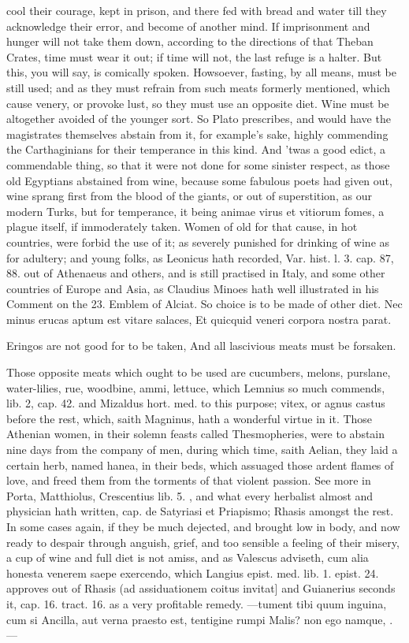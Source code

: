 cool their courage, kept in prison, and there fed with bread and water
till they acknowledge their error, and become of another mind. If
imprisonment and hunger will not take them down, according to the
directions of that  Theban Crates, time must wear it out; if time
will not, the last refuge is a halter. But this, you will say, is
comically spoken. Howsoever, fasting, by all means, must be still used;
and as they must refrain from such meats formerly mentioned, which
cause venery, or provoke lust, so they must use an opposite diet.
Wine must be altogether avoided of the younger sort. So
Plato prescribes, and would have the magistrates themselves
abstain from it, for example's sake, highly commending the
Carthaginians for their temperance in this kind. And 'twas a good
edict, a commendable thing, so that it were not done for some sinister
respect, as those old Egyptians abstained from wine, because some
fabulous poets had given out, wine sprang first from the blood of the
giants, or out of superstition, as our modern Turks, but for
temperance, it being animae virus et vitiorum fomes, a plague itself,
if immoderately taken. Women of old for that cause, in hot
countries, were forbid the use of it; as severely punished for drinking
of wine as for adultery; and young folks, as Leonicus hath recorded,
Var. hist. l. 3. cap. 87, 88. out of Athenaeus and others, and is still
practised in Italy, and some other countries of Europe and Asia, as
Claudius Minoes hath well illustrated in his Comment on the 23. Emblem
of Alciat. So choice is to be made of other diet.
Nec minus erucas aptum est vitare salaces,
Et quicquid veneri corpora nostra parat.

Eringos are not good for to be taken,
And all lascivious meats must be forsaken.

Those opposite meats which ought to be used are cucumbers, melons,
purslane, water-lilies, rue, woodbine, ammi, lettuce, which Lemnius so
much commends, lib. 2, cap. 42. and Mizaldus hort. med. to this
purpose; vitex, or agnus castus before the rest, which, saith
Magninus, hath a wonderful virtue in it. Those Athenian women, in
their solemn feasts called Thesmopheries, were to abstain nine days
from the company of men, during which time, saith Aelian, they laid a
certain herb, named hanea, in their beds, which assuaged those ardent
flames of love, and freed them from the torments of that violent
passion. See more in Porta, Matthiolus, Crescentius lib. 5. \etc{}, and
what every herbalist almost and physician hath written, cap. de
Satyriasi et Priapismo; Rhasis amongst the rest. In some cases again,
if they be much dejected, and brought low in body, and now ready to
despair through anguish, grief, and too sensible a feeling of their
misery, a cup of wine and full diet is not amiss, and as Valescus
adviseth, cum alia honesta venerem saepe exercendo, which Langius
epist. med. lib. 1. epist. 24. approves out of Rhasis (ad assiduationem
coitus invitat] and Guianerius seconds it, cap. 16. tract. 16. as a
 very profitable remedy.
---tument tibi quum inguina, cum si
Ancilla, aut verna praesto est, tentigine rumpi
Malis? non ego namque, \etc{}.---

